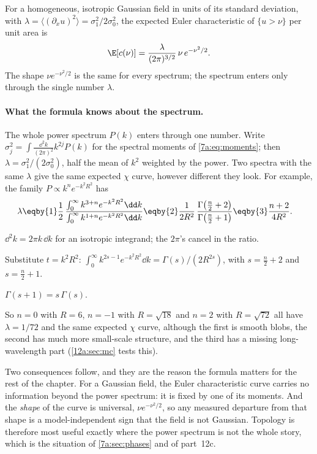 \begin{keyidea}
For a homogeneous, isotropic Gaussian field in units of its standard deviation, with
$\lambda=\langle(\partial_xu)^2\rangle=\sigma_1^2/2\sigma_0^2$, the expected Euler characteristic of
$\{u>\nu\}$ per unit area is
\[
  \E[c(\nu)]=\frac{\lambda}{(2\pi)^{3/2}}\,\nu\,e^{-\nu^2/2}.
\]
The shape $\nu e^{-\nu^2/2}$ is the same for every spectrum; the spectrum enters only through the single
number $\lambda$.
\end{keyidea}

\paragraph{What the formula knows about the spectrum.} The whole power spectrum $P(k)$ enters through one
number. Write $\sigma_j^2=\int\frac{\dd^2k}{(2\pi)^2}k^{2j}P(k)$ for the spectral moments of
\eqref{7a:eq:moments}; then $\lambda=\sigma_1^2/(2\sigma_0^2)$, half the mean of $k^2$ weighted by the power.
Two spectra with the same $\lambda$ give the same expected $\chi$ curve, however different they look. For
example, the family $P\propto k^ne^{-k^2R^2}$ has
\begin{align}
  \lambda
  &\eqby{1}\frac12\,\frac{\int_0^\infty k^{3+n}e^{-k^2R^2}\dd k}{\int_0^\infty k^{1+n}e^{-k^2R^2}\dd k}
   \eqby{2}\frac{1}{2R^2}\,\frac{\Gamma\big(\frac{n}{2}+2\big)}{\Gamma\big(\frac{n}{2}+1\big)}
   \eqby{3}\frac{n+2}{4R^2} .
  \label{12a:eq:lam-family}
\end{align}
\begin{explain}
  \item $\dd^2k=2\pi k\,\dd k$ for an isotropic integrand; the $2\pi$'s cancel in the ratio.
  \item Substitute $t=k^2R^2$: $\int_0^\infty k^{2s-1}e^{-k^2R^2}\dd k=\Gamma(s)/(2R^{2s})$, with $s=\frac n2+2$
        and $s=\frac n2+1$.
  \item $\Gamma(s+1)=s\,\Gamma(s)$.
\end{explain}
So $n=0$ with $R=6$, $n=-1$ with $R=\sqrt{18}$ and $n=2$ with $R=\sqrt{72}$ all have $\lambda=1/72$ and the
same expected $\chi$ curve, although the first is smooth blobs, the second has much more small-scale
structure, and the third has a missing long-wavelength part (\cref{12a:sec:mc} tests this).

Two consequences follow, and they are the reason the formula matters for the rest of the chapter. For a
Gaussian field, the Euler characteristic curve carries no information beyond the power spectrum: it is fixed
by one of its moments. And the \emph{shape} of the curve is universal, $\nu e^{-\nu^2/2}$, so any measured
departure from that shape is a model-independent sign that the field is not Gaussian. Topology is therefore
most useful exactly where the power spectrum is not the whole story, which is the situation of
\cref{7a:sec:phases} and of part~12c.

